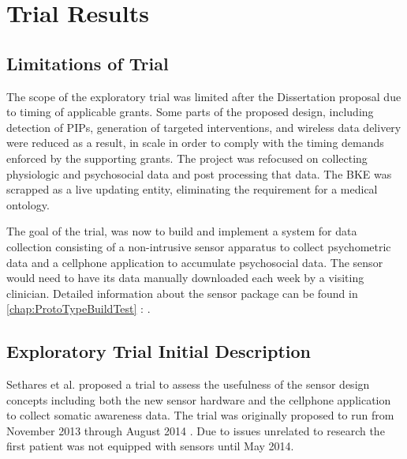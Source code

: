\chapter{Trial Results} 
\label{chap:trialResults}

\section {Limitations of Trial}
The scope of the exploratory trial was limited after the Dissertation proposal due to timing of applicable grants. Some parts of the proposed design, including detection of PIPs, generation of targeted interventions, and wireless data delivery were reduced as a result, in scale in order to comply with the timing demands enforced by the supporting grants. The project was refocused on collecting physiologic and psychosocial data and post processing that data. The BKE was scrapped as a live updating entity, eliminating the requirement for a medical ontology.

The goal of the trial, was now to build and implement a system for data collection consisting of a non-intrusive sensor apparatus to collect psychometric data and a cellphone application to accumulate psychosocial data. The sensor would need to have its data manually downloaded each week by a visiting clinician. Detailed information about the sensor package can be found in \cref{chap:ProtoTypeBuildTest} :  .


\section{Exploratory Trial Initial Description}

Sethares et al. proposed a trial to assess the usefulness of the sensor design concepts including both the new sensor hardware and the cellphone application to collect somatic awareness data.  The trial was originally proposed to run from November 2013 through August 2014 \cite{KristenASethares2013}. Due to issues unrelated to research the first patient was not equipped with sensors until May 2014.

